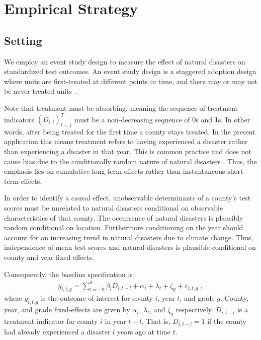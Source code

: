 
\section{Empirical Strategy} \label{EmpStrat}

\subsection{Setting}

We employ an event study design to measure the effect of natural disasters on standardized test outcomes. An event study design is a staggered adoption design where units are first-treated at different points in time, and there may or may not be never-treated units \citep{Sun_2021}.

Note that treatment must be absorbing, meaning the sequence of treatment indicators $(D_{i, t})_{t=1}^T$ must be a non-decreasing sequence of $0$s and $1$s. In other words, after being treated for the first time a county stays treated. In the present application this means treatment refers to having experienced a disaster rather than experiencing a disaster in that year. This is common practice and does not cause bias due to the conditionally random nature of natural disasters \citep{Deryugina_2017}. Thus, the emphasis lies on cumulative long-term effects rather than instantaneous short-term effects.

In order to identify a causal effect, unobservable determinants of a county's test scores must be unrelated to natural disasters conditional on observable characteristics of that county. The occurrence of natural disasters is plausibly random conditional on location. Furthermore conditioning on the year should account for an increasing trend in natural disasters due to climate change. Thus, independence of mean test scores and natural disasters is plausible conditional on county and year fixed effects.

Consequently, the baseline specification is
\begin{align} \label{baseline}
	y_{i, t, g} = \sum_{l = -9}^{8} \beta_l D_{i, t-l} + \alpha_i + \lambda_t + \zeta_g + \varepsilon_{i, t, g} \;,
\end{align}
where $y_{i, t, g}$ is the outcome of interest for county $i$, year $t$, and grade $g$. County, year, and grade fixed-effects are given by $\alpha_i$, $\lambda_t$, and $\zeta_g$ respectively. $D_{i, t-l}$ is a treatment indicator for county $i$ in year $t-l$. That is, $D_{i, t-l} = 1$ if the county had already experienced a disaster $l$ years ago at time $t$.

